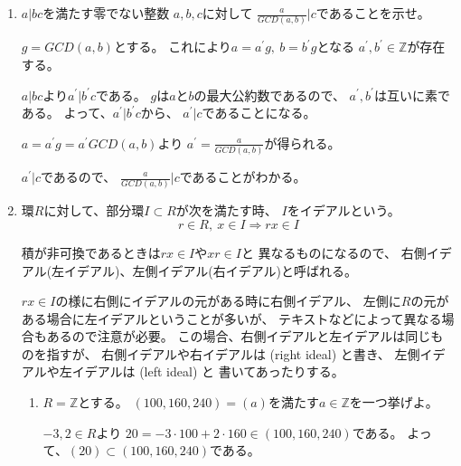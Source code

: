 \documentclass[12pt,b5paper]{ltjsarticle}
\begin{document}
\begin{enumerate}
 \item
      $a|bc$を満たす零でない整数 $a,b,c$に対して
      $\frac{a}{GCD(a,b)}|c$であることを示せ。

      \dotfill

      $g=GCD(a,b)$とする。
      これにより$a=a^\prime g, \ b=b^\prime g$となる
      $a^\prime,b^\prime \in \mathbb{Z}$が存在する。

      $a|bc$より$a^\prime | b^\prime c$である。
      $g$は$a$と$b$の最大公約数であるので、
      $a^\prime,b^\prime$は互いに素である。
      よって、$a^\prime | b^\prime c$から、
      $a^\prime | c$であることになる。

      $a=a^\prime g =a^\prime GCD(a,b)$より
      $a^\prime = \frac{a}{GCD(a,b)}$が得られる。

      $a^\prime | c$であるので、
      $\frac{a}{GCD(a,b)}|c$であることがわかる。

      \hrulefill

 \item
      \hrulefill

      環$R$に対して、部分環$I\subset R$が次を満たす時、
      $I$をイデアルという。
      \begin{equation}
       r\in R,\ x\in I \Rightarrow rx\in I
      \end{equation}

      積が非可換であるときは$rx\in I$や$xr\in I$と
      異なるものになるので、
      右側イデアル(左イデアル)、左側イデアル(右イデアル)と呼ばれる。

      $rx\in I$の様に右側にイデアルの元がある時に右側イデアル、
      左側に$R$の元がある場合に左イデアルということが多いが、
      テキストなどによって異なる場合もあるので注意が必要。
      この場合、右側イデアルと左イデアルは同じものを指すが、
      右側イデアルや右イデアルは (right ideal) と書き、
      左側イデアルや左イデアルは (left ideal) と
      書いてあったりする。

      \hrulefill

      \begin{enumerate}
       \item
            $R=\mathbb{Z}$とする。
            $(100,160,240)=(a)$を満たす$a\in\mathbb{Z}$を一つ挙げよ。

            \dotfill

            $-3,2\in R$より
            $20=-3\cdot 100 + 2\cdot160 \in (100,160,240)$である。
            よって、$(20)\subset (100,160,240)$である。


\end{enumerate}
\end{enumerate}
\end{document}

